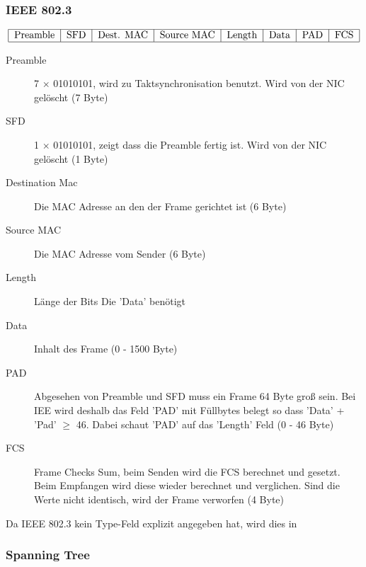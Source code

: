 \documentclass[a4paper,10pt]{scrartcl}
\begin{document}
        \subsubsection{IEEE 802.3}
            \[
                \begin{tabular}{|c|c|c|c|c|c|c|c|c|}
                    \hline
                        Preamble & SFD & Dest. MAC & Source MAC & Length & Data & PAD & FCS \\
                    \hline
                \end{tabular}
            \]
            \begin{description}
                \item[Preamble] 7 $\times$ 01010101, wird zu Taktsynchronisation benutzt. Wird von der NIC gelöscht (7 Byte)
                \item[SFD] 1 $\times$ 01010101, zeigt dass die Preamble fertig ist. Wird von der NIC gelöscht (1 Byte)
                \item[Destination Mac] Die MAC Adresse an den der Frame gerichtet ist (6 Byte) 
                \item[Source MAC] Die MAC Adresse vom Sender (6 Byte)
                \item[Length] Länge der Bits Die 'Data' benötigt
                \item[Data] Inhalt des Frame (0 - 1500 Byte)
                \item[PAD] Abgesehen von Preamble und SFD muss ein Frame 64 Byte groß sein. Bei IEE wird deshalb das Feld 'PAD' mit Füllbytes belegt so dass 'Data' + 'Pad' $\geq$ 46.
                Dabei schaut 'PAD' auf das 'Length' Feld (0 - 46 Byte)
                \item[FCS] Frame Checks Sum, beim Senden wird die FCS berechnet und gesetzt. Beim Empfangen wird diese wieder berechnet und verglichen. Sind die Werte nicht identisch, wird der Frame verworfen (4 Byte) 
            \end{description}
            Da IEEE 802.3 kein Type-Feld explizit angegeben hat, wird dies in 
        \subsubsection{Spanning Tree}
\end{document}

